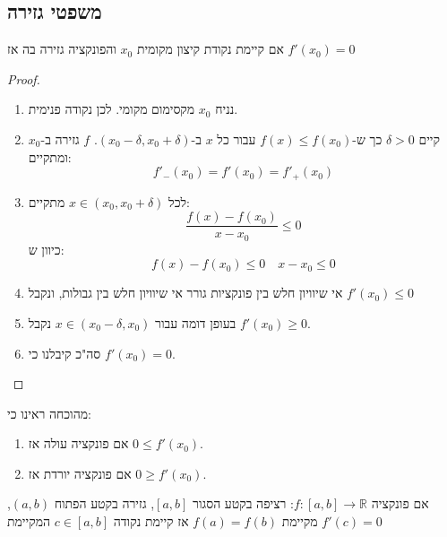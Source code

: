 \documentclass{tstextbook}
\begin{document}
\subsection{משפטי גזירה}

\begin{theorem}[פרמה]
אם קיימת נקודת קיצון מקומית \(x_0\) והפונקציה גזירה בה אז \(f'(x_0)=0\)

\end{theorem}
\begin{proof}
  \begin{enumerate}
    \item נניח \(x_{0}\) מקסימום מקומי. לכן נקודה פנימית. 


    \item קיים \(\delta>0\) כך ש-\(f(x)\leq f(x_{0})\) עבור כל \(x\) ב-\(\left( x_{0}-\delta,x_{0}+\delta \right)\). \(f\) גזירה ב-\(x_{0}\) ומתקיים: 
$$f'_{-}(x_{0})=f'(x_{0})=f'_{+}(x_{0})$$


    \item לכל \(x \in \left( x_{0},x_{0}+\delta \right)\) מתקיים: 
$$\frac{f(x)-f(x_{0})}{x-x_{0}}\leq 0$$
כיוון ש:
$$f(x)-f(x_{0})\leq 0\quad x-x_{0}\leq 0$$


    \item אי שיוויון חלש בין פונקציות גורר אי שיוויון חלש בין גבולות, ונקבל \(f'(x_{0})\leq 0\)


    \item בעופן דומה עבור \(x \in \left( x_{0}-\delta,x_{0} \right)\) נקבל \(f'(x_{0})\geq 0\). 


    \item סה"כ קיבלנו כי \(f'(x_{0})=0\). 


  \end{enumerate}
\end{proof}
\begin{corollary}
מהוכחה ראינו כי:

  \begin{enumerate}
    \item אם פונקציה עולה אז \(0\leq f'(x_{0})\). 


    \item אם פונקציה יורדת אז \(0\geq f'(x_{0})\). 


  \end{enumerate}
\end{corollary}
\begin{theorem}[רול]
אם פונקציה \(f:[a,b] \rightarrow \mathbb R\):
 רציפה בקטע הסגור \([a,b]\), גזירה בקטע הפתוח \((a,b)\), מקיימת \(f(a)=f(b)\)
אז קיימת נקודה \(c\in [a,b]\) המקיימת \(f'(c)=0\)

\end{theorem}
\end{document}
